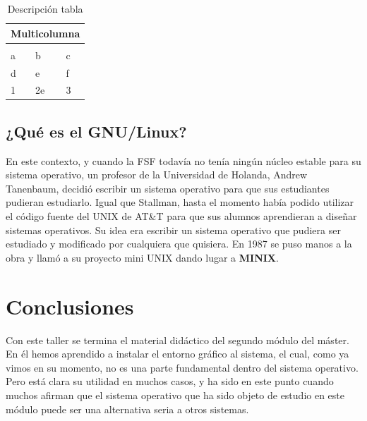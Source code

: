 \documentclass[12pt]{article}
\begin{document}
\begin{table}[!h]
\begin{tabular}{|p{5cm}|p{5cm}|p{5cm}|}\hline 

\multicolumn{3}{|c|}{{\bf Multicolumna}}\\\hline 

\cellcolor[gray]{0.9} \centering {\bf Acción(es) de Mejora} & 
\cellcolor[gray]{0.9} \centering {\bf Plazo (inicio y término)} & 
\cellcolor[gray]{0.9} \centering {\bf Necesidad de recursos y fuente de financiamiento} \tabularnewline

\hline
a & b & c\\\hline 
d & e & f\\\hline 
1 &2e & 3\\\hline 

\end{tabular}
\caption {Descripción tabla}
\label{tabla1}
\end{table}

\subsection{¿Qué es el GNU/Linux?}

En este contexto, y cuando la FSF todavía no tenía ningún núcleo estable para su sistema operativo, un profesor de la Universidad de Holanda, Andrew Tanenbaum, decidió escribir un sistema operativo para que sus estudiantes pudieran estudiarlo. Igual que Stallman, hasta el momento había podido utilizar el código fuente del UNIX de AT\&T para que sus alumnos aprendieran a diseñar sistemas operativos. Su idea era escribir un sistema operativo que pudiera ser estudiado y modificado por cualquiera que quisiera. En 1987 se puso manos a la obra y llamó a su proyecto mini UNIX dando lugar a {\bf MINIX}.

\section{Conclusiones}
Con este taller se termina el material didáctico del segundo módulo del máster. En él hemos aprendido a instalar el entorno gráfico al sistema, el cual, como ya vimos en su momento, no es una parte fundamental dentro del sistema operativo. Pero está clara su utilidad en muchos casos, y ha sido en este punto cuando muchos afirman que el sistema operativo que ha sido objeto de estudio en este módulo puede ser una alternativa seria a otros sistemas. 
\end{document}
